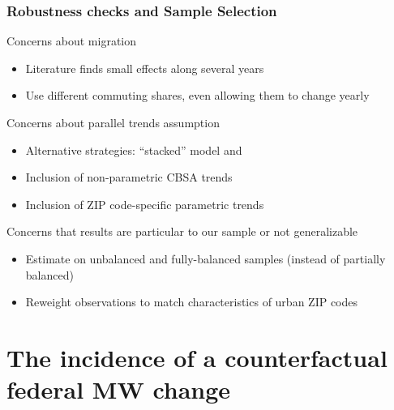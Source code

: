 \documentclass[aspectratio=169, t]{beamer}
\begin{document}
\begin{frame}[label = robustness]
    \frametitle{Robustness checks and Sample Selection}

    Concerns about migration
    \begin{itemize}
        \item Literature finds small effects along several years {\color{gray}\parencite[e.g.,][]{PerezPerez2021}}
        \item Use different commuting shares, even allowing them to change yearly
        
    \end{itemize}

    \vspace{1.5mm}
    Concerns about parallel trends assumption
    \begin{itemize}
        \item Alternative strategies: ``stacked'' model and \textcite{ArellanoBond1991}
        \item Inclusion of non-parametric CBSA trends
        \item Inclusion of ZIP code-specific parametric trends
    \end{itemize}

    \vspace{1.5mm}
    Concerns that results are particular to our sample or not generalizable
    \begin{itemize}
        \item Estimate on unbalanced and fully-balanced samples (instead of partially balanced)
        \item Reweight observations to match characteristics of urban ZIP codes
        
        \hyperlink{robustness_sample}{}
    \end{itemize}
    
\end{frame}

\section{The incidence of a counterfactual federal MW change}
\end{document}
